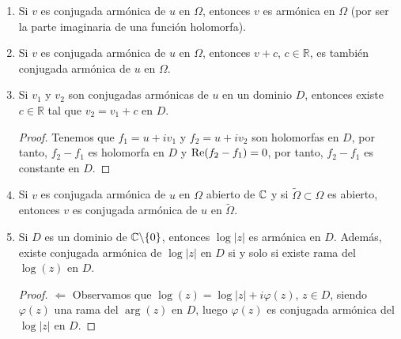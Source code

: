 \begin{ejemplo}
    \begin{enumerate}
        \item Si $v$ es conjugada armónica de $u$ en $\Omega$, entonces $v$ es armónica en $\Omega$ (por ser la parte imaginaria de una función holomorfa).
        \item Si $v$ es conjugada armónica de $u$ en $\Omega$, entonces $v + c$, $c \in \mathbb{R}$, es también conjugada armónica de $u$ en $\Omega$.
        \item Si $v_1$ y $v_2$ son conjugadas armónicas de $u$ en un dominio $D$, entonces existe $c \in \mathbb{R}$ tal que $v_2 = v_1 + c$ en $D$.
              \begin{proof}
                  Tenemos que $f_1 = u +iv_1$ y $f_2 = u + iv_2$ son holomorfas en $D$, por tanto, $f_2 - f_1$ es holomorfa en $D$ y $\text{Re}(f_2 - f_1) = 0$, por tanto, $f_2 - f_1$ es constante en $D$.
              \end{proof}
        \item Si $v$ es conjugada armónica de $u$ en $\Omega$ abierto de $\mathbb{C}$ y si $\widetilde{\Omega} \subset \Omega$ es abierto, entonces $v$ es conjugada armónica de $u$ en $\widetilde{\Omega}$.
        \item Si $D$ es un dominio de $\mathbb{C} \backslash \{0\}$, entonces $\log|z|$ es armónica en $D$. Además, existe conjugada armónica de $\log|z|$ en $D$ si y solo si existe rama del $\log(z)$ en $D$.
              \begin{proof}
                  $\boxed{\Longleftarrow}$ Observamos que $\log(z) = \log|z| + i\varphi(z)$, $z \in D$, siendo $\varphi(z)$ una rama del $\arg(z)$ en $D$, luego $\varphi(z)$ es conjugada armónica del $\log|z|$ en $D$.


\end{proof}
\end{enumerate}
\end{ejemplo}
